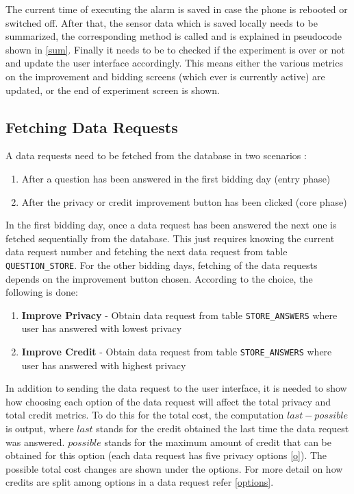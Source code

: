 The current time of executing the alarm is saved in case the phone is rebooted or switched off. After that, the sensor data which is saved locally
needs to be summarized, the corresponding method is called and is explained in pseudocode shown in \ref{sum}. Finally it needs to be to checked if the experiment is over or not and update the user interface accordingly. This means either the various metrics on the improvement and bidding screens (which ever is currently active) are updated, or
the end of experiment screen is shown.

\subsection{Fetching Data Requests} \label{data_req}
A data requests need to be fetched from the database in two scenarios :

\begin{enumerate}
	\item After a question has been answered in the first bidding day (entry phase)
	\item After the privacy or credit improvement button has been clicked (core phase)
\end{enumerate}

In the first bidding day, once a data request has been answered the next one is fetched sequentially from the database. This just requires knowing the current data request number and fetching the next data request from table \texttt{QUESTION\_STORE}. For the other bidding days, fetching of the data requests depends on the improvement button chosen. According to the choice, the following is done:

\begin{enumerate}
	\item \textbf{Improve Privacy} - Obtain data request from table \texttt{STORE\_ANSWERS} where user has answered with lowest privacy
	\item \textbf{Improve Credit} - Obtain data request from table \texttt{STORE\_ANSWERS} where user has answered with highest privacy
\end{enumerate}

In addition to sending the data request to the user interface, it is needed to show how choosing each option of the data request will affect the total privacy and total credit metrics. To do this for the total cost, the computation $last-possible$ is output, where $last$ stands for the credit obtained the last time the data request was answered. $possible$ stands for the maximum amount of credit that can be obtained for this option (each data request has five privacy options \ref{o}). The possible total cost changes are shown under the options. For more detail on how credits are split among options in a data request refer \ref{options}.

